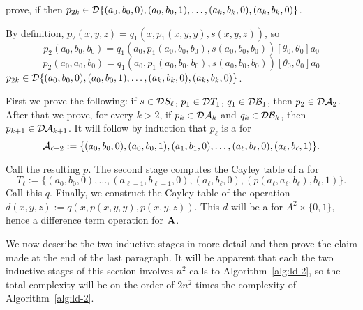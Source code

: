   
  
  prove, if
  then
  $p_{2k} \in \mathcal{D} \{(a_0, b_0, 0), (a_0, b_0, 1), \dots, (a_k, b_k, 0), (a_k, b_k, 0)\}$.
  
  By definition,
  $p_2(x,y,z) = q_1(x, p_1(x,y,y), s(x,y,z))$, so 
  \[
  p_2(a_0, b_0, b_0) = q_1(a_0, p_1(a_0,b_0,b_0), s(a_0,b_0,b_0))\mathrel{[\theta_0, \theta_0]}a_0
  \]
  \[
  p_2(a_0, a_0, b_0) = q_1(a_0, p_1(a_0,b_0,b_0), s(a_0,b_0,b_0))\mathrel{[\theta_0, \theta_0]}a_0
  \]
  $p_{2k} \in \mathcal{D} \{(a_0, b_0, 0), (a_0, b_0, 1), \dots, (a_k, b_k, 0), (a_k, b_k, 0)\}$.
  
  First we prove the following: if $s \in \mathcal{D} S_\ell$,  $p_1 \in \mathcal{D} T_1$, $q_1\in \mathcal{D} \mathcal{B}_1$,
  then $p_2 \in \mathcal{D} \mathcal{A}_2$.
  After that we prove, for every $k>2$, if 
  $p_{k} \in \mathcal{D} \mathcal{A}_{k}$ and $q_{k} \in \mathcal{D} \mathcal{B}_k$, then 
  $p_{k+1} \in \mathcal{D} \mathcal{A}_{k+1}$.  It will follow by induction that 
  $p_{\ell}$ is a \ldto for 
  \[
    \mathcal{A}_{\ell-2} :=  \{(a_0, b_0, 0), (a_0, b_0, 1), (a_1,b_1,0), \dots, 
    (a_{\ell}, b_{\ell}, 0), (a_\ell, b_\ell, 1)\}.
  \]
  
  
  

























  Call the resulting \ldto $p$.  The second stage computes the Cayley table of a \ldto for
  \[T_\ell := \{(a_0, b_0, 0), \dots,
  (a_{\ell-1}, b_{\ell-1},0), (a_{\ell}, b_{\ell},0), (p(a_{\ell}, a_{\ell}, b_{\ell}), b_\ell, 1)\}.
  \]
  Call this \ldto $q$. Finally, we construct the Cayley table of the operation
  $d(x,y,z) := q(x, p(x,y,y), p(x,y,z))$.
  This $d$ will be a \ldto for $A^2 \times \{0,1\}$, hence a difference term operation for $\mathbf{A}$.
  
  We now describe the two inductive stages in more detail and then prove the claim made at the end of the 
  last paragraph. It will be apparent that 
  each the two inductive stages of this section involves 
  $n^2$ calls to Algorithm~\ref{alg:ld-2}, so the total complexity will be on the order of 
  $2n^2$ times the complexity of Algorithm~\ref{alg:ld-2}.
  
